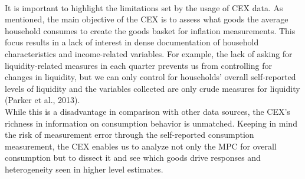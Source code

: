 \\ It is important to highlight the limitations set by the usage of CEX data. As mentioned, the main objective of the CEX is to assess what goods the average household consumes to create the goods basket for inflation measurements. This focus results in a lack of interest in dense documentation of household characteristics and income-related variables. For example, the lack of asking for liquidity-related measures in each quarter prevents us from controlling for changes in liquidity, but we can only control for households' overall self-reported levels of liquidity and the variables collected are only crude measures for liquidity (Parker et al., 2013). \\
While this is a disadvantage in comparison with other data sources, the CEX's richness in information on consumption behavior is unmatched. Keeping in mind the risk of measurement error through the self-reported consumption measurement, the CEX enables us to analyze not only the MPC for overall consumption but to dissect it and see which goods drive responses and heterogeneity seen in higher level estimates.